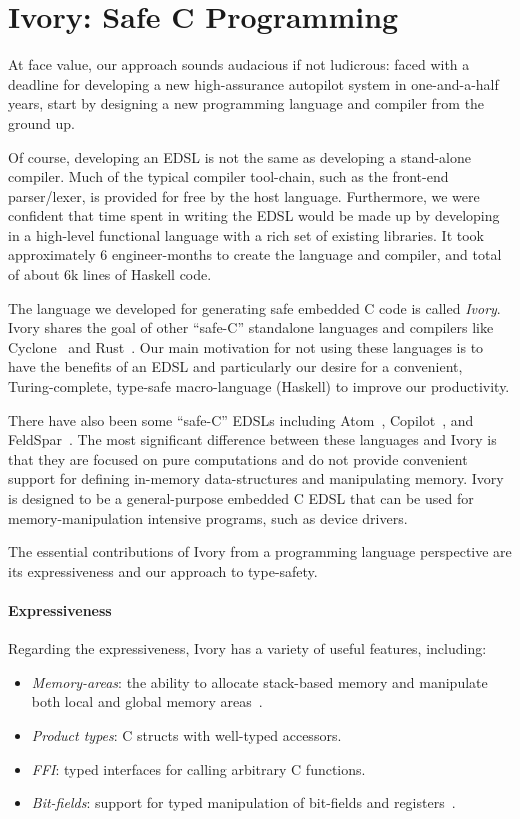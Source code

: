 \section{Ivory: Safe C Programming}
\label{sec:ivory}

At face value, our approach sounds audacious if not ludicrous: faced with a
deadline for developing a new high-assurance autopilot system in one-and-a-half
years, start by designing a new programming language and compiler from the
ground up.

Of course, developing an EDSL is not the same as developing a stand-alone
compiler.  Much of the typical compiler tool-chain, such as the front-end
parser/lexer, is provided for free by the host language.  Furthermore, we were
confident that time spent in writing the EDSL would be made up by developing in
a high-level functional language with a rich set of existing libraries. It took
approximately 6 engineer-months to create the language and compiler, and
total of about 6k lines of Haskell code.

The language we developed for generating safe embedded C code is called
\emph{Ivory}.  Ivory shares the goal of other ``safe-C'' standalone languages
and compilers like Cyclone~\cite{cyclone} and Rust~\cite{rust}.  Our main
motivation for not using these languages is to have the benefits of an EDSL and
particularly our desire for a convenient, Turing-complete, type-safe
macro-language (Haskell) to improve our productivity.

There have also been some ``safe-C'' EDSLs including Atom~\cite{atom},
Copilot~\cite{copilot}, and FeldSpar~\cite{feldspar1}.  The most significant
difference between these languages and Ivory is that they are focused on pure
computations and do not provide convenient support for defining in-memory
data-structures and manipulating memory.  Ivory is designed to be a
general-purpose embedded C EDSL that can be used for memory-manipulation
intensive programs, such as device drivers.

The essential contributions of Ivory from a programming language perspective are
its expressiveness and our approach to type-safety.

\paragraph{Expressiveness}
Regarding the expressiveness, Ivory has a variety of useful features, including:
\begin{itemize}
  \item \emph{Memory-areas}: the ability to allocate stack-based memory and
    manipulate both local and global memory areas~\cite{memareas}.
  \item \emph{Product types}: C structs with well-typed accessors.
  \item \emph{FFI}: typed interfaces for calling arbitrary C functions.
  \item \emph{Bit-fields}: support for typed manipulation of bit-fields and
    registers~\cite{high-level}.
\end{itemize}

